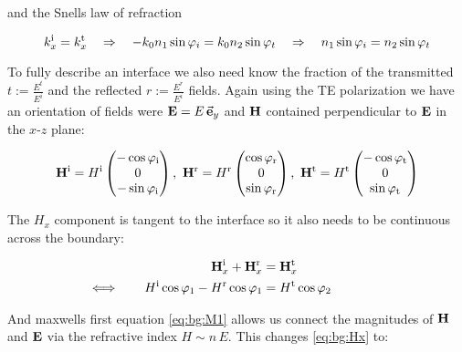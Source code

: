 and the Snells law of refraction

\begin{equation}
    k^{\mathrm{i}}_x = k^{\mathrm{t}}_x
    \quad \Rightarrow \quad
    - k_0 n_1 \sin \varphi_i =  k_0 n_2 \sin \varphi_t
    \quad \Rightarrow \quad
    n_1 \sin \varphi_i = n_2 \sin \varphi_t
\end{equation}

To fully describe an interface we also need know the fraction of the transmitted
$t := \frac{ E^t}{ E^i}$
and the reflected
$r := \frac{ E^r}{ E^i}$ fields.
Again using the TE polarization we have an orientation of fields were $\vb E = E \, \va e_y$ and $\vb H$ contained perpendicular to $\vb E$ in the $x$-$z$ plane:

\begin{equation} \label{eq:bg:H}
    \vb H^{\mathrm{i}} = H^{\mathrm{i}}
    \begin{pmatrix}
        -\cos \varphi_{\mathrm{i}}\\ 0\\ -\sin \varphi_{\mathrm{i}}
    \end{pmatrix}
    , \
    \vb H^{\mathrm{r}} = H^{\mathrm{r}}
    \begin{pmatrix}
        \cos \varphi_{\mathrm{r}} \\ 0\\ \sin \varphi_{\mathrm{r}}
    \end{pmatrix}
    , \
    \vb H^{\mathrm{t}} = H^{\mathrm{t}}
    \begin{pmatrix}
        -\cos \varphi_{\mathrm{t}}\\ 0\\ \sin \varphi_{\mathrm{t}}
    \end{pmatrix}
\end{equation}


The $H_x$ component is tangent to the interface so it also needs to be continuous across the boundary:

\begin{equation}\label{eq:bg:Hx}
\begin{aligned}
    \vb H^{\mathrm{i}}_x + \vb H^{\mathrm{r}}_x &= \vb H^{\mathrm{t}}_x \\
    \Longleftrightarrow \qquad
    H^{\mathrm{i}} \cos \varphi_1 - H^{\mathrm{r}} \cos \varphi_1 &= H^{\mathrm{t}} \cos \varphi_2
    \qquad  \qquad
\end{aligned}
\end{equation}

And maxwells first equation \eqref{eq:bg:M1} allows us connect the magnitudes of $\vb H$ and $\vb E$ via the refractive index $H \sim n \, E$. This changes \eqref{eq:bg:Hx} to:

